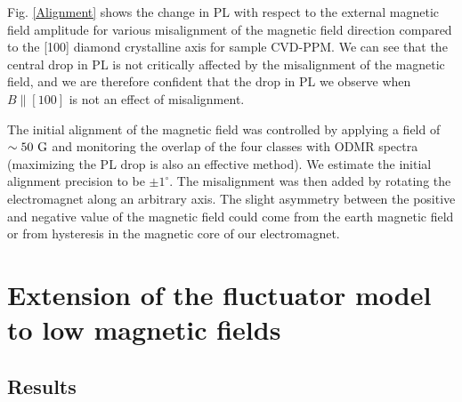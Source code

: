 \documentclass[preprintnumbers,amsmath,amssymb,onecolumn,12pt]{revtex4-2}\usepackage{graphicx}%
\begin{document}
Fig. \ref{Alignment} shows the change in PL with respect to the external magnetic field amplitude for various misalignment of the magnetic field direction compared to the [100] diamond crystalline axis for sample CVD-PPM. We can see that the central drop in PL is not critically affected by the misalignment of the magnetic field, and we are therefore confident that the drop in PL we observe when $B\parallel [100]$ is not an effect of misalignment.

The initial alignment of the magnetic field was controlled by applying a field of $\sim 50\ \rm G$ and monitoring the overlap of the four classes with ODMR spectra (maximizing the PL drop is also an effective method). We estimate the initial alignment precision to be $\pm 1^\circ$. The misalignment was then added by rotating the electromagnet along an arbitrary axis. The slight asymmetry between the positive and negative value of the magnetic field could come from the earth magnetic field or from hysteresis in the magnetic core of our electromagnet.
\section{Extension of the fluctuator model to low magnetic fields}

\subsection{Results}
\end{document}
